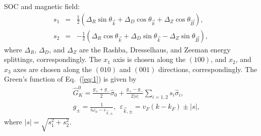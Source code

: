 \documentclass[prb,aps,twocolumn]{revtex4}
\newcommand{\bea}{\begin{eqnarray}}
\newcommand{\eea}{\end{eqnarray}}
\newcommand{\e}{\varepsilon}
\newcommand{\bk}{{\vec k}}
\newcommand{\bB}{{\vec B}}
\newcommand{\nn}{\nonumber}
\begin{document}
SOC and magnetic field: \bea\label{eq:temp}
s_1&=&\frac{1}{2}\left(\Delta_R\sin\theta_\bk+\Delta_D\cos\theta_\bk+\Delta_Z\cos\theta_\bB\right),\nn\\
s_2&=&-\frac{1}{2}\left(\Delta_R\cos\theta_\bk+\Delta_D\sin\theta_\bk-\Delta_Z\sin\theta_\bB\right),
\eea where $\Delta_R$, $\Delta_D$, and $\Delta_Z$ are the Rashba,
Dresselhaus, and Zeeman energy splittings, correspondingly. The
$x_1$ axis is chosen along the $(100)$, and $x_2$, and $x_3$ axes
are chosen along the $(010)$ and $(001)$ directions,
correspondingly. The Green's function of Eq.~(\ref{eq:1}) is given
by \bea\label{eq:2}
&&\hat G^0_K=\frac{g_++g_-}{2}\hat\sigma_0 + \frac{g_+-g_-}{2|s|}\sum_{i=1,2}{s_i}\hat\sigma_i,\nn\\
&&g_{\pm}=\frac{1}{i\omega_n-\e_{\bk,\pm}},~~\e_{\bk,\pm}=v_F(k-k_F)\pm|s|,\eea
where $|s|=\sqrt{s_1^2+s_2^2}$.
\end{document}
